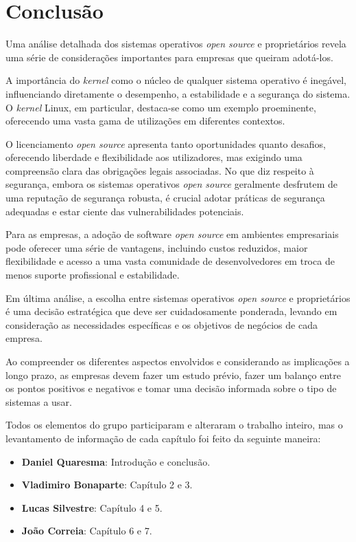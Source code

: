 \section{Conclusão} \label{section: introdução}
Uma análise detalhada dos sistemas operativos \textit{open source} e proprietários revela uma série de considerações importantes para empresas que queiram adotá-los.
\par \vspace{6pt}
A importância do \textit{kernel} como o núcleo de qualquer sistema operativo é inegável, influenciando diretamente o desempenho, a estabilidade e a segurança do sistema. O \textit{kernel} Linux, em particular, destaca-se como um exemplo proeminente, oferecendo uma vasta gama de utilizações em diferentes contextos.
\par \vspace{6pt}
O licenciamento \textit{open source} apresenta tanto oportunidades quanto desafios, oferecendo liberdade e flexibilidade aos utilizadores, mas exigindo uma compreensão clara das obrigações legais associadas. No que diz respeito à segurança, embora os sistemas operativos \textit{open source} geralmente desfrutem de uma reputação de segurança robusta, é crucial adotar práticas de segurança adequadas e estar ciente das vulnerabilidades potenciais.
\par \vspace{6pt}
Para as empresas, a adoção de software \textit{open source} em ambientes empresariais pode oferecer uma série de vantagens, incluindo custos reduzidos, maior flexibilidade e acesso a uma vasta comunidade de desenvolvedores em troca de menos suporte profissional e estabilidade.
\par \vspace{6pt}
Em última análise, a escolha entre sistemas operativos \textit{open source} e proprietários é uma decisão estratégica que deve ser cuidadosamente ponderada, levando em consideração as necessidades específicas e os objetivos de negócios de cada empresa.
\par \vspace{6pt}
Ao compreender os diferentes aspectos envolvidos e considerando as implicações a longo prazo, as empresas devem fazer um estudo prévio, fazer um balanço entre os pontos positivos e negativos e tomar uma decisão informada sobre o tipo de sistemas a usar.
\par\vspace{24pt}

Todos os elementos do grupo participaram e alteraram o trabalho inteiro, mas o levantamento de informação de cada capítulo foi feito da seguinte maneira:
\begin{itemize}
\item \textbf{Daniel Quaresma}: Introdução e conclusão.
\item \textbf{Vladimiro Bonaparte}: Capítulo 2 e 3.
\item \textbf{Lucas Silvestre}: Capítulo 4 e 5.
\item \textbf{João Correia}: Capítulo 6 e 7.
\end{itemize}
